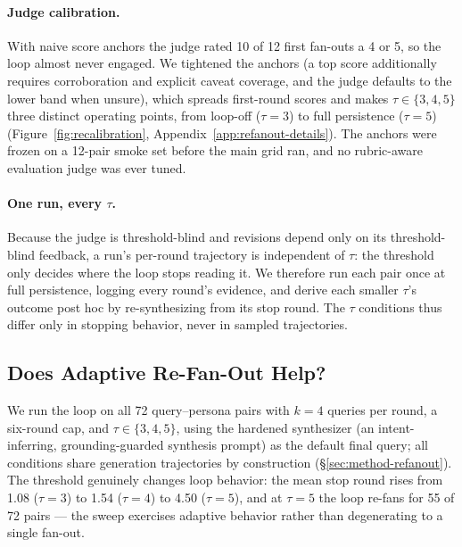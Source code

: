 \paragraph{Judge calibration.}
With naive score anchors the judge rated 10 of 12 first fan-outs a 4 or 5,
so the loop almost never engaged. We tightened the anchors (a top score
additionally requires corroboration and explicit caveat coverage, and the
judge defaults to the lower band when unsure), which spreads first-round
scores and makes $\tau\in\{3,4,5\}$ three distinct operating points, from
loop-off ($\tau{=}3$) to full persistence ($\tau{=}5$)
(Figure~\ref{fig:recalibration}, Appendix~\ref{app:refanout-details}). The
anchors were frozen on a 12-pair smoke set before the main grid ran, and no
rubric-aware evaluation judge was ever tuned.

\paragraph{One run, every $\tau$.}
Because the judge is threshold-blind and revisions depend only on its
threshold-blind feedback, a run's per-round trajectory is independent of
$\tau$: the threshold only decides where the loop stops reading it. We
therefore run each pair once at full persistence, logging every round's
evidence, and derive each smaller $\tau$'s outcome post hoc by re-synthesizing
from its stop round. The $\tau$ conditions thus differ only in stopping
behavior, never in sampled trajectories.

\subsection{Does Adaptive Re-Fan-Out Help?}
\label{sec:results-refanout}

We run the loop on all 72 query--persona pairs with $k{=}4$ queries per round,
a six-round cap, and $\tau\in\{3,4,5\}$, using the hardened synthesizer (an
intent-inferring, grounding-guarded synthesis prompt) as the default final
query; all conditions share generation trajectories by construction
(\S\ref{sec:method-refanout}).
The threshold genuinely changes loop behavior: the mean stop round rises from
1.08 ($\tau{=}3$) to 1.54 ($\tau{=}4$) to 4.50 ($\tau{=}5$), and at
$\tau{=}5$ the loop re-fans for 55 of 72 pairs --- the sweep exercises
adaptive behavior rather than degenerating to a single fan-out.

